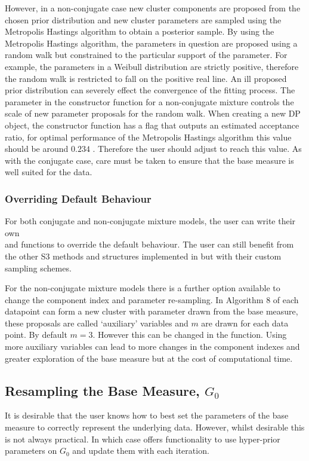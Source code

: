 \documentclass[nojss]{jss}
\begin{document}
However, in a non-conjugate case new cluster components are proposed from the chosen prior distribution and new cluster parameters are sampled using the Metropolis Hastings algorithm to obtain a posterior sample. By using the Metropolis Hastings algorithm, the parameters in question are proposed using a random walk but constrained to the particular support of the parameter. For example, the parameters in a Weibull distribution are strictly positive, therefore the random walk is restricted to fall on the positive real line. An ill proposed prior distribution can severely effect the convergence of the fitting process. The parameter  in the constructor function for a non-conjugate mixture controls the scale of new parameter proposals for the random walk. When creating a new DP object, the constructor function has a flag  that outputs an estimated acceptance ratio, for optimal performance of the Metropolis Hastings algorithm this value should be around $0.234$ \citep{gelman_efficient_1996}. Therefore the user should adjust  to reach this value. As with the conjugate case, care must be taken to ensure that the base measure is well suited for the data.

\subsubsection{Overriding Default Behaviour}
For both conjugate and non-conjugate mixture models, the user can write their own \\  and  functions to override the default behaviour. The user can still benefit from the other S3 methods and structures implemented in  but with their custom sampling schemes.

For the non-conjugate mixture models there is a further option available to change the component index and parameter re-sampling. In Algorithm 8 of \cite{neal_markov_2000} each datapoint can form a new cluster with parameter drawn from the base measure, these proposals are called `auxiliary' variables and $m$ are drawn for each data point. By default $m=3$. However this can be changed in the  function. Using more auxiliary variables can lead to more changes in the component indexes and greater exploration of the base measure but at the cost of computational time.

\subsection{Resampling the Base Measure, $G_0$}
It is desirable that the user knows how to best set the parameters of the base measure to correctly represent the underlying data. However, whilst desirable this is not always practical. In which case  offers functionality to use hyper-prior parameters on $G_0$ and update them with each iteration.
\end{document}
